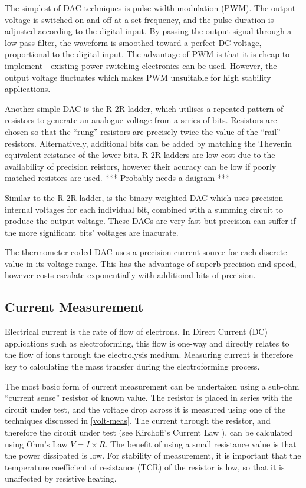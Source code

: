 The simplest of DAC techniques is pulse width modulation (PWM). The output voltage is switched on and off at a set frequency, and the pulse duration is adjusted according to the digital input. By passing the output signal through a low pass filter, the waveform is smoothed toward a perfect DC voltage, proportional to the digital input. The advantage of PWM is that it is cheap to implement - existing power switching electronics can be used. However, the output voltage fluctuates which makes PWM unsuitable for high stability applications.

Another simple DAC is the R-2R ladder, which utilises a repeated pattern of resistors to generate an analogue voltage from a series of bits. Resistors are chosen so that the ``rung'' resistors are precisely twice the value of the ``rail'' resistors. Alternatively, additional bits can be added by matching the Thevenin equivalent reistance of the lower bits. R-2R ladders are low cost due to the availability of precision reistors, however their acuracy can be low if poorly matched resistors are used. *** Probably needs a daigram ***

Similar to the R-2R ladder, is the binary weighted DAC which uses precision internal voltages for each individual bit, combined with a summing circuit to produce the output voltage. These DACs are very fast but precision can suffer if the more significant bits' voltages are inacurate.


The thermometer-coded DAC uses a precision current source for each discrete value in its voltage range. This has the advantage of superb precision and speed, however costs escalate exponentially with additional bits of precision.



\subsection{Current Measurement}
Electrical current is the rate of flow of electrons. In Direct Current (DC) applications such as electroforming, this flow is one-way and directly relates to the flow of ions through the electrolysis medium. Measuring current is therefore key to calculating the mass transfer during the electroforming process.

The most basic form of current measurement can be undertaken using a sub-ohm ``current sense'' resistor of known value. The resistor is placed in series with the circuit under test, and the voltage drop across it is measured using one of the techniques discussed in \ref{volt-meas}. The current through the resistor, and therefore the circuit under test (see Kirchoff's Current Law \cite{kirchoff}), can be calculated using Ohm's Law \cite{ohm} $V = I \times R$. The benefit of using a small resistance value is that the power dissipated is low. For stability of measurement, it is important that the temperature coefficient of resistance (TCR) of the resistor is low, so that it is unaffected by resistive heating. 

